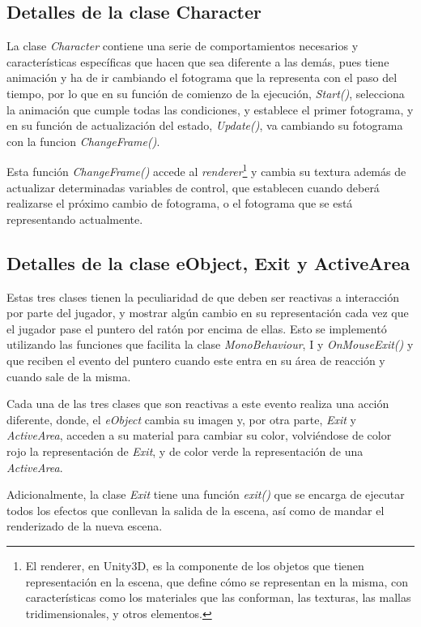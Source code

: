 \subsection{Detalles de la clase Character}

La clase \textit{Character} contiene una serie de comportamientos necesarios y características específicas que hacen que sea diferente a las demás, pues tiene animación y ha de ir cambiando el fotograma que la representa con el paso del tiempo, por lo que en su función de comienzo de la ejecución, \textit{Start()}, selecciona la animación que cumple todas las condiciones, y establece el primer fotograma, y en su función de actualización del estado, \textit{Update()}, va cambiando su fotograma con la funcion \textit{ChangeFrame()}.

Esta función \textit{ChangeFrame()} accede al \textit{renderer}\footnote{El renderer, en Unity3D, es la componente de los objetos que tienen representación en la escena, que define cómo se representan en la misma, con características como los materiales que las conforman, las texturas, las mallas tridimensionales, y otros elementos.} y cambia su textura además de actualizar determinadas variables de control, que establecen cuando deberá realizarse el próximo cambio de fotograma, o el fotograma que se está representando actualmente.

\subsection{Detalles de la clase eObject, Exit y ActiveArea}

Estas tres clases tienen la peculiaridad de que deben ser reactivas a interacción por parte del jugador, y mostrar algún cambio en su representación cada vez que el jugador pase el puntero del ratón por encima de ellas. Esto se implementó utilizando las funciones que facilita la clase \textit{MonoBehaviour}, I y \textit{OnMouseExit()} y que reciben el evento del puntero cuando este entra en su área de reacción y cuando sale de la misma.

Cada una de las tres clases que son reactivas a este evento realiza una acción diferente, donde, el \textit{eObject} cambia su imagen y, por otra parte, \textit{Exit} y \textit{ActiveArea}, acceden a su material para cambiar su color, volviéndose de color rojo la representación de \textit{Exit}, y de color verde la representación de una \textit{ActiveArea}.

Adicionalmente, la clase \textit{Exit} tiene una función \textit{exit()} que se encarga de ejecutar todos los efectos que conllevan la salida de la escena, así como de mandar el renderizado de la nueva escena.

